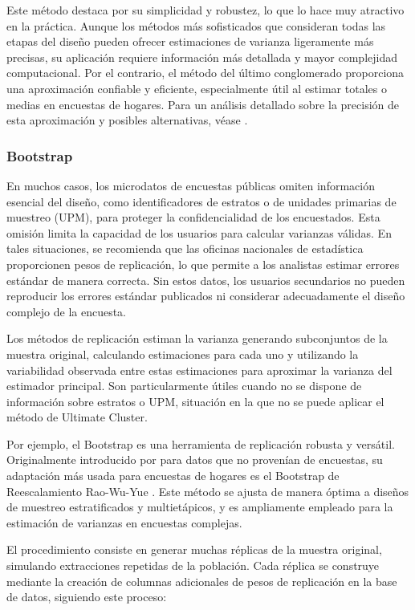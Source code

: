 \documentclass[
  spanish,
  12pt,
]{book}
\begin{document}
Este método destaca por su simplicidad y robustez, lo que lo hace muy atractivo en la práctica. Aunque los métodos más sofisticados que consideran todas las etapas del diseño pueden ofrecer estimaciones de varianza ligeramente más precisas, su aplicación requiere información más detallada y mayor complejidad computacional. Por el contrario, el método del último conglomerado proporciona una aproximación confiable y eficiente, especialmente útil al estimar totales o medias en encuestas de hogares. Para un análisis detallado sobre la precisión de esta aproximación y posibles alternativas, véase \citet{sarndal2003model}.

\subsubsection{Bootstrap}\label{bootstrap}

En muchos casos, los microdatos de encuestas públicas omiten información esencial del diseño, como identificadores de estratos o de unidades primarias de muestreo (UPM), para proteger la confidencialidad de los encuestados. Esta omisión limita la capacidad de los usuarios para calcular varianzas válidas. En tales situaciones, se recomienda que las oficinas nacionales de estadística proporcionen pesos de replicación, lo que permite a los analistas estimar errores estándar de manera correcta. Sin estos datos, los usuarios secundarios no pueden reproducir los errores estándar publicados ni considerar adecuadamente el diseño complejo de la encuesta.

Los métodos de replicación estiman la varianza generando subconjuntos de la muestra original, calculando estimaciones para cada uno y utilizando la variabilidad observada entre estas estimaciones para aproximar la varianza del estimador principal. Son particularmente útiles cuando no se dispone de información sobre estratos o UPM, situación en la que no se puede aplicar el método de Ultimate Cluster.

Por ejemplo, el Bootstrap es una herramienta de replicación robusta y versátil. Originalmente introducido por \citet{efron1979bootstrap} para datos que no provenían de encuestas, su adaptación más usada para encuestas de hogares es el Bootstrap de Reescalamiento Rao-Wu-Yue \citep{rao1992resampling}. Este método se ajusta de manera óptima a diseños de muestreo estratificados y multietápicos, y es ampliamente empleado para la estimación de varianzas en encuestas complejas.

El procedimiento consiste en generar muchas réplicas de la muestra original, simulando extracciones repetidas de la población. Cada réplica se construye mediante la creación de columnas adicionales de pesos de replicación en la base de datos, siguiendo este proceso:
\end{document}
